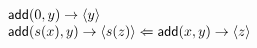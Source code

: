$$\begin{array}{l@{}}
\mathsf{add}(0, y) \rightarrow \langle y \rangle\\ 
\mathsf{add}(s(x), y) \rightarrow \langle s(z) \rangle \Leftarrow \mathsf{add}(x, y)\rightarrow \langle z\rangle \\ 
\\ \end{array}$$
